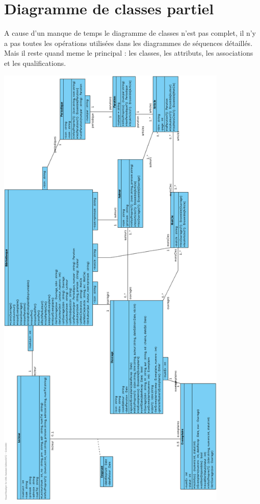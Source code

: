 \documentclass[a4paper,10pt]{report}
\begin{document}
\section*{Diagramme de classes partiel}
\bigskip
\bigskip
\begin{flushleft}
A cause d'un manque de temps le diagramme de classes n'est pas complet, il n'y a pas toutes les opérations utilisées dans les diagrammes de séquences détaillés. Mais il reste quand meme le principal : les classes, les attributs, les associations et les qualifications.\\
\end{flushleft}
\includegraphics[height=220mm]{diagrammeDeClassePartiel.png}
\newpage
\end{document}

